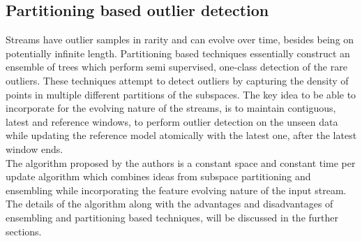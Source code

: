\subsection{Partitioning based outlier detection}

Streams have outlier samples in rarity and can evolve over time, besides being on potentially infinite length. Partitioning based techniques\cite{tan2011fast} essentially construct an ensemble of trees which perform semi supervised, one-class detection of the rare outliers. These techniques attempt to detect outliers by capturing the density of points in multiple different partitions of the subspaces. The key idea to be able to incorporate for the evolving nature of the streams, is to maintain contiguous, latest and reference windows, to perform outlier detection on the unseen data while updating the reference model atomically with the latest one, after the latest window ends. \\

The algorithm proposed by the authors is a constant space and constant time per update algorithm which combines ideas from subspace partitioning and ensembling while incorporating the feature evolving nature of the input stream. The details of the algorithm along with the advantages and disadvantages of ensembling and partitioning based techniques, will be discussed in the further sections.






